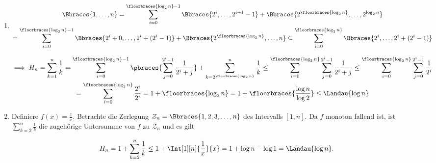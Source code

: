 \begin{solution}

\phantom{}

\begin{enumerate}

  \item

  \begin{multline*}
    \Bbraces{1, \dots, n}
    =
    \sum_{i=0}^{\floorbraces{\log_2{n}} - 1}
    \Bbraces{2^i, \dots, 2^{i+1} - 1}
    +
    \Bbraces{2^{\floorbraces{\log_2{n}}}, \dots, 2^{\log_2{n}}} \\
    =
    \sum_{i=0}^{\floorbraces{\log_2{n}} - 1}
    \Bbraces{2^i + 0, \dots, 2^i + (2^i - 1)}
    +
    \Bbraces{2^{\floorbraces{\log_2{n}}}, \dots, n}
    \subseteq
    \sum_{i=0}^{\floorbraces{\log_2{n}}}
    \Bbraces{2^i, \dots, 2^i + (2^i - 1)}
  \end{multline*}

  \begin{multline*}
    \implies
    H_n
    =
    \sum_{k=1}^n \frac{1}{k}
    =
    \sum_{i=0}^{\floorbraces{\log_2{n}} - 1}
    \pbraces
    {
      \sum_{j=0}^{2^i - 1}
      \frac{1}{2^i + j}
    }
    +
    \sum_{k = 2^\floorbraces{\log_2{n}}}^n
    \frac{1}{k}
    \leq
    \sum_{i=0}^{\floorbraces{\log_2{n}}}
    \sum_{j=0}^{2^i - 1}
    \frac{1}{2^i + j}
    \leq
    \sum_{i=0}^{\floorbraces{\log_2{n}}}
    \sum_{j=0}^{2^i - 1}
    \frac{1}{2^i} \\
    =
    \sum_{i=0}^{\floorbraces{\log_2{n}}}
    \frac{2^i}{2^i}
    =
    1 + \floorbraces{\log_2{n}}
    =
    1 + \floorbraces{\frac{\log{n}}{\log{2}}}
    \leq
    \Landau{\log{n}}
  \end{multline*}

  \item

  Definiere $f(x) = \frac{1}{x}$. Betrachte die Zerlegung $\mathcal{Z}_n = \Bbraces{1, 2, 3, \dots, n}$ des Intervalls $[1, n]$.
  Da $f$ monoton fallend ist, ist $\sum_{k=2}^n\frac{1}{k}$ die zugehörige Untersumme von $f$ zu $\mathcal{Z}_n$ und es gilt

  \begin{align*}
    H_n
    =
    1 + \sum_{k=2}^n \frac{1}{k}
    \leq
    1 + \Int[1][n]{\frac{1}{x}}{x}
    =
    1 + \log{n} - \log{1}
    =
    \Landau{\log{n}}.
  \end{align*}

\end{enumerate}

\end{solution}

